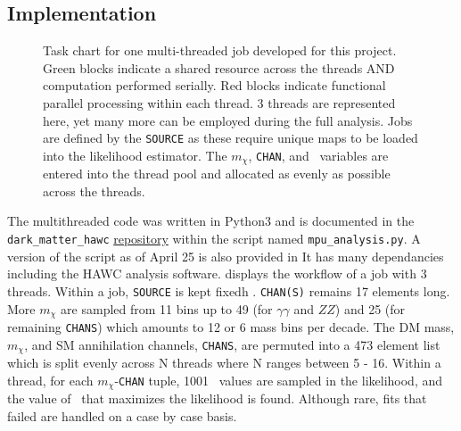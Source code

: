 \subsection{Implementation}\label{sec:mtd_implementation}

\begin{figure}[h]
    \caption{Task chart for one multi-threaded job developed for this project. Green blocks indicate a shared resource across the threads AND computation performed serially. Red blocks indicate functional parallel processing within each thread. 3 threads are represented here, yet many more can be employed during the full analysis. Jobs are defined by the \texttt{SOURCE} as these require unique maps to be loaded into the likelihood estimator. The $m_\chi$, \texttt{CHAN}, and \sv~variables are entered into the thread pool and allocated as evenly as possible across the threads.}
    \label{fig:mtd_multithreads}
\end{figure}

The multithreaded code was written in Python3 and is documented in the \texttt{dark\_matter\_hawc} \href{https://gitlab.com/hawc-observatory/sandboxes/salaza82/dark\_matter\_hawc}{repository} within the script named \texttt{mpu\_analysis.py}.
A version of the script as of April 25  is also provided in 
It has many dependancies including the HAWC analysis software.
 displays the workflow of a job with 3 threads.
Within a job, \texttt{SOURCE} is kept fixedh .
\texttt{CHAN(S)} remains 17 elements long.
More $m_\chi$ are sampled from 11 bins up to 49 (for $\gamma\gamma$ and $ZZ$) and 25 (for remaining \texttt{CHANS}) which amounts to 12 or 6 mass bins per decade.
The DM mass, $m_\chi$, and SM annihilation channels, \texttt{CHANS}, are permuted into a 473 element list which is split evenly across N threads where N ranges between 5 - 16.
Within a thread, for each $m_\chi$-\texttt{CHAN} tuple, 1001 \sv~values are sampled in the likelihood, and the value of \sv~that maximizes the likelihood is found.
Although rare, fits that failed are handled on a case by case basis.

